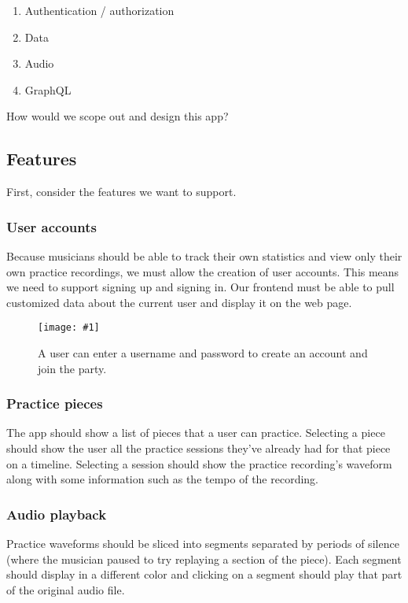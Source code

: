 \documentclass{article}
\newcommand{\screenshot}[2]{
  \begin{figure}[h]
    \texttt{[image: \#1]}
    \caption*{#2}
  \end{figure}
}
\begin{document}
\begin{enumerate}
  \item Authentication / authorization
  \item Data
  \item Audio
  \item GraphQL
\end{enumerate}

How would we scope out and design this app?

\subsection{Features}
First, consider the features we want to support.

\subsubsection{User accounts}

Because musicians should be able to track their own statistics and view only their own practice recordings, we must allow the creation of user accounts.
This means we need to support signing up and signing in.
Our frontend must be able to pull customized data about the current user and display it on the web page.

\screenshot{jong-signup}{A user can enter a username and password to create an account and join the party.}

\subsubsection{Practice pieces}

The app should show a list of pieces that a user can practice.
Selecting a piece should show the user all the practice sessions they've already had for that piece on a timeline.
Selecting a session should show the practice recording's waveform along with some information such as the tempo of the recording.

\subsubsection{Audio playback}

Practice waveforms should be sliced into segments separated by periods of silence (where the musician paused to try replaying a section of the piece).
Each segment should display in a different color and clicking on a segment should play that part of the original audio file.
\end{document}

